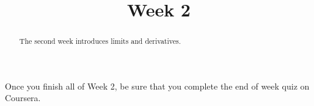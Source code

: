 \documentclass{ximera}
\title{Week 2}
\begin{document}
\begin{abstract}
  The second week introduces limits and derivatives.
\end{abstract}


Once you finish all of Week 2, be sure that you complete the end of
week quiz on Coursera.
\end{document}
